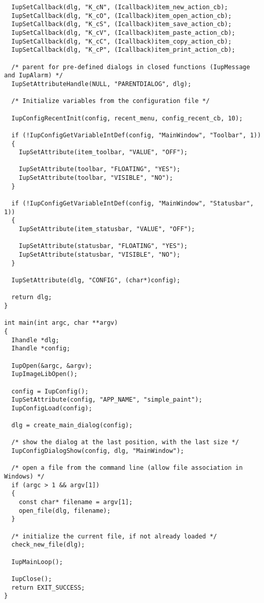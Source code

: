 \documentclass{ctexart}
\begin{document}
\begin{lstlisting}
  IupSetCallback(dlg, "K_cN", (Icallback)item_new_action_cb);
  IupSetCallback(dlg, "K_cO", (Icallback)item_open_action_cb);
  IupSetCallback(dlg, "K_cS", (Icallback)item_save_action_cb);
  IupSetCallback(dlg, "K_cV", (Icallback)item_paste_action_cb);
  IupSetCallback(dlg, "K_cC", (Icallback)item_copy_action_cb);
  IupSetCallback(dlg, "K_cP", (Icallback)item_print_action_cb);

  /* parent for pre-defined dialogs in closed functions (IupMessage and IupAlarm) */
  IupSetAttributeHandle(NULL, "PARENTDIALOG", dlg);

  /* Initialize variables from the configuration file */

  IupConfigRecentInit(config, recent_menu, config_recent_cb, 10);

  if (!IupConfigGetVariableIntDef(config, "MainWindow", "Toolbar", 1))
  {
    IupSetAttribute(item_toolbar, "VALUE", "OFF");

    IupSetAttribute(toolbar, "FLOATING", "YES");
    IupSetAttribute(toolbar, "VISIBLE", "NO");
  }

  if (!IupConfigGetVariableIntDef(config, "MainWindow", "Statusbar", 1))
  {
    IupSetAttribute(item_statusbar, "VALUE", "OFF");

    IupSetAttribute(statusbar, "FLOATING", "YES");
    IupSetAttribute(statusbar, "VISIBLE", "NO");
  }

  IupSetAttribute(dlg, "CONFIG", (char*)config);

  return dlg;
}

int main(int argc, char **argv)
{
  Ihandle *dlg;
  Ihandle *config;

  IupOpen(&argc, &argv);
  IupImageLibOpen();

  config = IupConfig();
  IupSetAttribute(config, "APP_NAME", "simple_paint");
  IupConfigLoad(config);

  dlg = create_main_dialog(config);

  /* show the dialog at the last position, with the last size */
  IupConfigDialogShow(config, dlg, "MainWindow");

  /* open a file from the command line (allow file association in Windows) */
  if (argc > 1 && argv[1])
  {
    const char* filename = argv[1];
    open_file(dlg, filename);
  }

  /* initialize the current file, if not already loaded */
  check_new_file(dlg);

  IupMainLoop();

  IupClose();
  return EXIT_SUCCESS;
}


\end{lstlisting}
\end{document}
